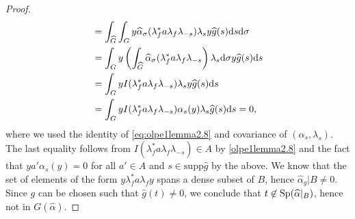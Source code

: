 \begin{proof}
\begin{align*}
		&= \int_{\widehat{G}} \int_G y \widehat{\alpha}_{\sigma}(\lambda_f^* a \lambda_f \lambda_{-s}) \lambda_s y \widehat{g}(s) \mathrm{d} s \mathrm{d} \sigma\\
		&= \int_{G} y \left( \int_{\widehat{G}} \widehat{\alpha}_{\sigma}(\lambda_f^* a \lambda_f \lambda_{-s}\right) \lambda_s \mathrm{d} \sigma y \widehat{g}(s) \mathrm{d} s\\
		&= \int_G y I(\lambda_f^* a \lambda_f \lambda_{-s}) \lambda_s y \widehat{g}(s) \mathrm{d} s\\
		&= \int_G y I(\lambda_f^* a \lambda_f \lambda_{-s}) \alpha_s(y) \lambda_s \widehat{g}(s)\mathrm{d} s = 0,
	\end{align*}
	where we used the identity of \cref{eq:olpe1lemma2.8} and covariance of $(\alpha_s,\lambda_s)$. The last equality follows from $I(\lambda_f^* a \lambda_f \lambda_{-s}) \in A$ by \cref{olpe1lemma2.8} and the fact that $y a' \alpha_s(y)= 0 $ for all $a' \in A$ and $s \in \mathrm{supp} \hat g$ by the above. We know that the set of elements of the form $y \lambda_f^* a \lambda_f y$ spans a dense subset of $B$, hence $\hat \alpha_g | B \neq 0$. Since $g$ can be chosen such that $\hat g (t) \neq 0$, we conclude that $t \not \in \mathrm{Sp}(\widehat{\alpha}|_B)$, hence not in $G(\hat \alpha)$.


\end{proof}

